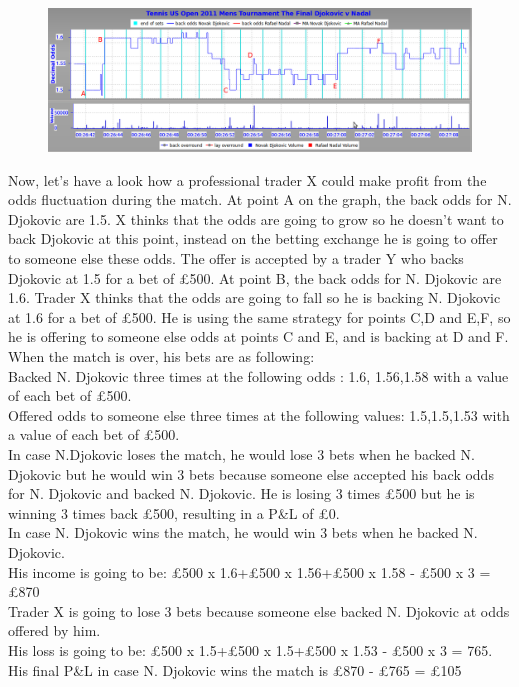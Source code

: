 \documentclass[10pt]{report}
\begin{document}
\begin{figure}[ht]
\centering
\includegraphics[scale=0.4]{tenistrading.png}
\caption{}
\end{figure}

Now, let's have a look how a professional trader X could make profit from the odds fluctuation during the match.
At point A on the graph, the back odds for N. Djokovic are 1.5. X thinks that the odds are going to grow so he doesn't want to back Djokovic at this point,
instead on the betting exchange he is going to offer to someone else these odds. The offer is accepted by a trader Y who backs Djokovic at 1.5 for a bet of \pounds500. 
At point B, the back odds for N. Djokovic are 1.6. Trader X thinks that the odds are going to fall so he is backing N. Djokovic at 1.6 for a bet of \pounds500. 
He is using the same strategy for points C,D and E,F, so he is offering to someone else odds at points C and E, and is backing at D and F. \\
When the match is over, his bets are as following:\\
Backed N. Djokovic three times at the following odds : 1.6, 1.56,1.58 with a value of each bet of \pounds500. \\
Offered odds to someone else three times at the following values: 1.5,1.5,1.53 with a value of each bet of \pounds500.\\

In case N.Djokovic loses the match, he would lose 3 bets when he backed N. Djokovic but he would win 3 bets because someone else accepted his back odds for N. Djokovic 
and backed N. Djokovic. 
He is losing 3 times \pounds500 but he is winning 3 times back \pounds500, resulting in a P\&L of \pounds0.\\

In case N. Djokovic wins the match, he would win 3 bets when he backed N. Djokovic. \\
His income is going to be: \pounds500 x 1.6+\pounds500 x 1.56+\pounds500 x 1.58 -  \pounds500 x 3 = \pounds870\\
Trader X is going to lose 3 bets because someone else backed N. Djokovic at odds offered by him. \\
His loss is going to be: \pounds500 x 1.5+\pounds500 x 1.5+\pounds500 x 1.53 - \pounds500 x 3  = 765. \\
His final  P\&L in case N. Djokovic wins the match is \pounds870 - \pounds765 = \pounds105
\end{document}
